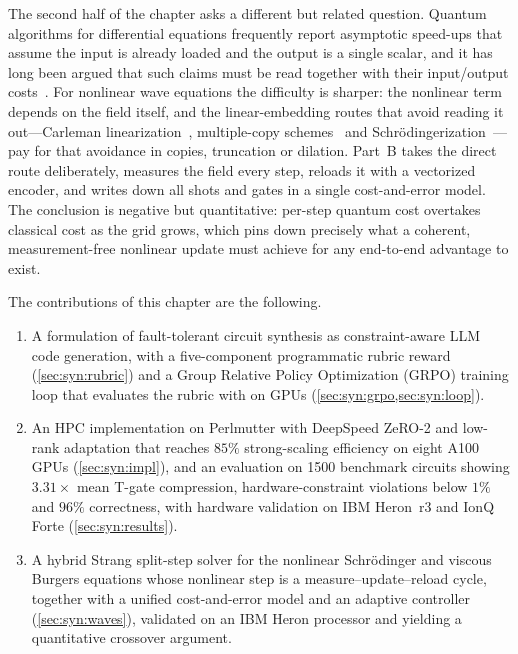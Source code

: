 The second half of the chapter asks a different but related question. Quantum algorithms for differential equations frequently report asymptotic speed-ups that assume the input is already loaded and the output is a single scalar, and it has long been argued that such claims must be read together with their input/output costs~\cite{aaronson2015fineprint}. For nonlinear wave equations the difficulty is sharper: the nonlinear term depends on the field itself, and the linear-embedding routes that avoid reading it out---Carleman linearization~\cite{liu2021carleman}, multiple-copy schemes~\cite{lloyd2020nonlinear} and Schr\"odingerization~\cite{jin2024schrodingerization}---pay for that avoidance in copies, truncation or dilation. Part~B takes the direct route deliberately, measures the field every step, reloads it with a vectorized encoder, and writes down all shots and gates in a single cost-and-error model. The conclusion is negative but quantitative: per-step quantum cost overtakes classical cost as the grid grows, which pins down precisely what a coherent, measurement-free nonlinear update must achieve for any end-to-end advantage to exist.

The contributions of this chapter are the following.
\begin{enumerate}
  \item A formulation of fault-tolerant circuit synthesis as constraint-aware LLM code generation, with a five-component programmatic rubric reward (\cref{sec:syn:rubric}) and a Group Relative Policy Optimization (GRPO) training loop that evaluates the rubric with \cudaq{} on GPUs (\cref{sec:syn:grpo,sec:syn:loop}).
  \item An HPC implementation on Perlmutter with DeepSpeed ZeRO-2 and low-rank adaptation that reaches $85\%$ strong-scaling efficiency on eight A100 GPUs (\cref{sec:syn:impl}), and an evaluation on \num{1500} benchmark circuits showing $3.31\times$ mean T-gate compression, hardware-constraint violations below $1\%$ and $96\%$ correctness, with hardware validation on IBM Heron~r3 and IonQ Forte (\cref{sec:syn:results}).
  \item A hybrid Strang split-step solver for the nonlinear Schr\"odinger and viscous Burgers equations whose nonlinear step is a measure--update--reload cycle, together with a unified cost-and-error model and an adaptive controller (\cref{sec:syn:waves}), validated on an IBM Heron processor and yielding a quantitative crossover argument.
\end{enumerate}

